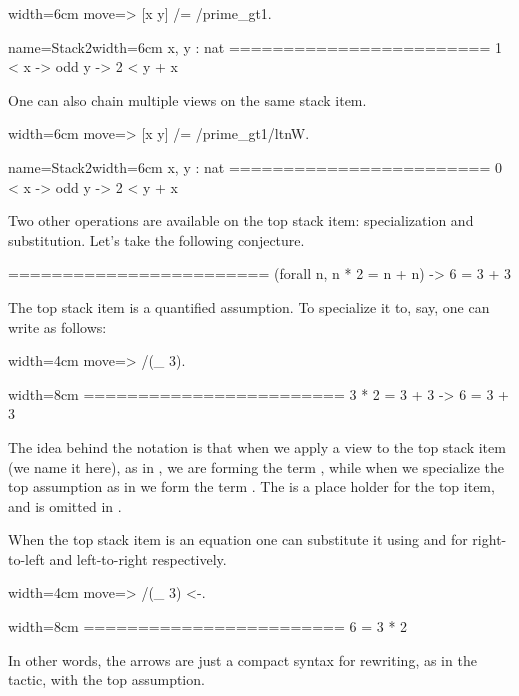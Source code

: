 \begin{coq}{}{width=6cm}
move=> [x y] /= /prime_gt1.
\end{coq}
\begin{coqout}{name=Stack2}{width=6cm}
 x, y : nat
 ========================
 1 < x -> odd y -> 2 < y + x
\end{coqout}

One can also chain multiple views on the same stack item.

\begin{coq}{}{width=6cm}
move=> [x y] /= /prime_gt1/ltnW.
\end{coq}
\begin{coqout}{name=Stack2}{width=6cm}
 x, y : nat
 ========================
 0 < x -> odd y -> 2 < y + x
\end{coqout}

Two other operations are available on the top stack item: specialization
and substitution.  Let's take the following conjecture.

\begin{coqout}{}{}
========================
(forall n, n * 2 = n + n) -> 6 = 3 + 3
\end{coqout}

The top stack item is a quantified assumption.  To specialize it to, say,
 one can write as follows:

\begin{coq}{}{width=4cm}
move=> /(_ 3).
\end{coq}
\begin{coqout}{}{width=8cm}
========================
3 * 2 = 3 + 3 -> 6 = 3 + 3
\end{coqout}
The idea behind the notation is that when we apply a view to the top
stack item (we name it  here), as in , we are
forming the term , while
when we specialize the top assumption as in  we form the
term .  The \C{_} is a place holder for the top item, and is
omitted in .

When the top stack item is an equation one can substitute it using \C{<-}
and \C{->} for right-to-left and left-to-right respectively.

\begin{coq}{}{width=4cm}
move=> /(_ 3) <-.
\end{coq}
\begin{coqout}{}{width=8cm}
========================
6 = 3 * 2
\end{coqout}
In other words, the arrows are just a compact syntax for rewriting,
as in the  tactic, with the top assumption.

